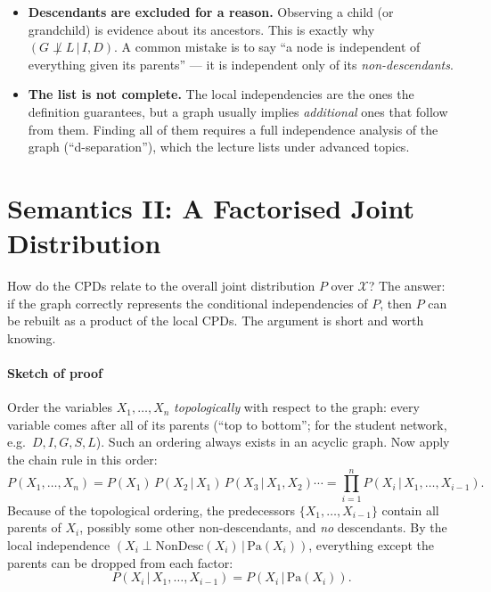 \documentclass[11pt, oneside]{book}
\newcommand{\Prob}{\mathbb{P}}           %
\newcommand{\given}{\,\vert\,}           %
\newcommand{\Pa}{\mathrm{Pa}}            %
\newcommand{\NonDesc}{\mathrm{NonDesc}}  %
\newcommand{\indep}{\perp}               %
\newcommand{\nindep}{\not\perp}          %
\newcommand{\Xall}{\mathcal{X}}          %
\let\originalsection\section
\renewcommand{\section}{\Needspace{7\baselineskip}\originalsection}
\begin{document}
\begin{notebox}[title={Two things to watch out for}]
\begin{itemize}
  \item \textbf{Descendants are excluded for a reason.} Observing a child (or
    grandchild) is evidence about its ancestors. This is exactly why
    $(G \nindep L \given I, D)$. A common mistake is to say ``a node is
    independent of everything given its parents'' --- it is independent only
    of its \emph{non-descendants}.
  \item \textbf{The list is not complete.} The local independencies are the
    ones the definition guarantees, but a graph usually implies
    \emph{additional} ones that follow from them. Finding all of them requires
    a full independence analysis of the graph (``d-separation''), which the
    lecture lists under advanced topics.
\end{itemize}
\end{notebox}

\section{Semantics II: A Factorised Joint Distribution}
\label{sec:factorisation}

How do the CPDs relate to the overall joint distribution $P$ over $\Xall$?
The answer: if the graph correctly represents the conditional independencies
of $P$, then $P$ can be rebuilt as a product of the local CPDs. The argument is
short and worth knowing.

\paragraph{Sketch of proof} Order the variables $X_1, \ldots, X_n$
\emph{topologically} with respect to the graph: every variable comes after all
of its parents (``top to bottom''; for the student network, e.g.\
$D, I, G, S, L$). Such an ordering always exists in an acyclic graph. Now apply
the chain rule in this order:
\[
P(X_1, \ldots, X_n) = P(X_1)\, P(X_2 \given X_1)\, P(X_3 \given X_1, X_2) \cdots
= \prod_{i=1}^{n} P(X_i \given X_1, \ldots, X_{i-1}).
\]
Because of the topological ordering, the predecessors $\{X_1, \ldots,
X_{i-1}\}$ contain all parents of $X_i$, possibly some other non-descendants,
and \emph{no} descendants. By the local independence $(X_i \indep
\NonDesc(X_i) \given \Pa(X_i))$, everything except the parents can be dropped
from each factor:
\[
P(X_i \given X_1, \ldots, X_{i-1}) = P(X_i \given \Pa(X_i)).
\]
\end{document}
